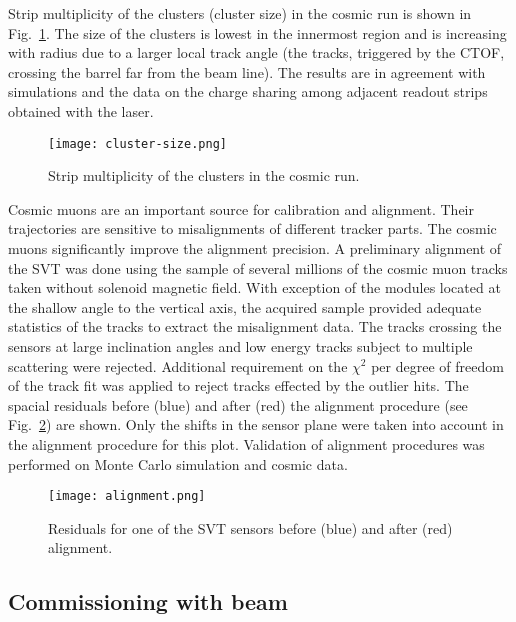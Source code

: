 Strip multiplicity of the clusters (cluster size) in the cosmic run is shown in Fig.~\ref{fig:cluster-size}. The size of the clusters is lowest in the innermost region and is increasing with radius due to a larger local track angle (the tracks, triggered by the CTOF, crossing the barrel far from the beam line). The results are in agreement with simulations and the data on the charge sharing among adjacent readout strips obtained with the laser.

\begin{figure}[hbt] 
\centering 
\texttt{[image: cluster-size.png]}
\caption{Strip multiplicity of the clusters in the cosmic run.}
\label{fig:cluster-size}
\end{figure}

Cosmic muons are an important source for calibration and alignment. Their trajectories are sensitive to misalignments of different tracker parts. The cosmic muons significantly improve the alignment precision. A preliminary alignment of the SVT was done using the sample of several millions of the cosmic muon tracks taken without solenoid magnetic field. With exception of the modules located at the shallow angle to the vertical axis, the acquired sample provided adequate statistics of the tracks to extract the misalignment data. The tracks crossing the sensors at large inclination angles and low energy tracks subject to multiple scattering were rejected. Additional requirement on the $\chi^2$ per degree of freedom of the track fit was applied to reject tracks effected by the outlier hits. The spacial residuals before (blue) and after (red) the alignment procedure (see Fig.~\ref{fig:alignment}) are shown. Only the shifts in the sensor plane were taken into account in the alignment procedure for this plot. Validation of alignment procedures was performed on Monte Carlo simulation and cosmic data.

\begin{figure}[hbt] 
\centering 
\texttt{[image: alignment.png]}
\caption{Residuals for one of the SVT sensors before (blue) and after (red) alignment.}
\label{fig:alignment}
\end{figure}

\subsection{Commissioning with beam}

